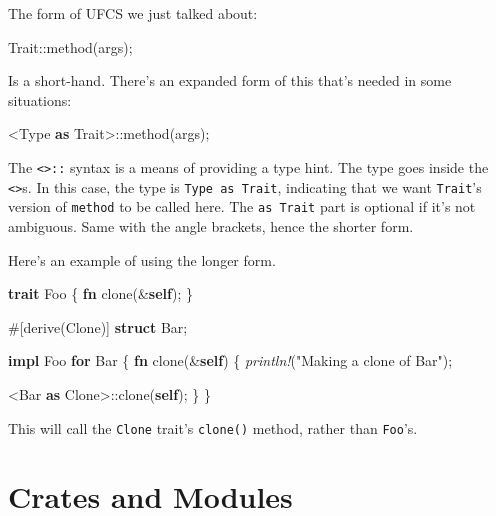 \documentclass[a4paper,]{book}
\newenvironment{Shaded}{\begin{snugshade}}{\end{snugshade}}
\newcommand{\KeywordTok}[1]{\textcolor[rgb]{0.13,0.29,0.53}{\textbf{{#1}}}}
\newcommand{\StringTok}[1]{\textcolor[rgb]{0.31,0.60,0.02}{{#1}}}
\newcommand{\BuiltInTok}[1]{{#1}}
\newcommand{\PreprocessorTok}[1]{\textcolor[rgb]{0.56,0.35,0.01}{\textit{{#1}}}}
\newcommand{\AttributeTok}[1]{\textcolor[rgb]{0.77,0.63,0.00}{{#1}}}
\newcommand{\NormalTok}[1]{{#1}}
\begin{document}
The form of UFCS we just talked about:

\begin{Shaded}
\begin{Highlighting}[]
\NormalTok{Trait::method(args);}
\end{Highlighting}
\end{Shaded}

Is a short-hand. There's an expanded form of this that's needed in some
situations:

\begin{Shaded}
\begin{Highlighting}[]
\NormalTok{<Type }\KeywordTok{as} \NormalTok{Trait>::method(args);}
\end{Highlighting}
\end{Shaded}

The \texttt{\textless{}\textgreater{}::} syntax is a means of providing
a type hint. The type goes inside the
\texttt{\textless{}\textgreater{}}s. In this case, the type is
\texttt{Type\ as\ Trait}, indicating that we want \texttt{Trait}'s
version of \texttt{method} to be called here. The \texttt{as\ Trait}
part is optional if it's not ambiguous. Same with the angle brackets,
hence the shorter form.

Here's an example of using the longer form.

\begin{Shaded}
\begin{Highlighting}[]
\KeywordTok{trait} \NormalTok{Foo \{}
    \KeywordTok{fn} \NormalTok{clone(&}\KeywordTok{self}\NormalTok{);}
\NormalTok{\}}

\AttributeTok{#[}\NormalTok{derive}\AttributeTok{(}\BuiltInTok{Clone}\AttributeTok{)]}
\KeywordTok{struct} \NormalTok{Bar;}

\KeywordTok{impl} \NormalTok{Foo }\KeywordTok{for} \NormalTok{Bar \{}
    \KeywordTok{fn} \NormalTok{clone(&}\KeywordTok{self}\NormalTok{) \{}
        \PreprocessorTok{println!}\NormalTok{(}\StringTok{"Making a clone of Bar"}\NormalTok{);}

        \NormalTok{<Bar }\KeywordTok{as} \BuiltInTok{Clone}\NormalTok{>::clone(}\KeywordTok{self}\NormalTok{);}
    \NormalTok{\}}
\NormalTok{\}}
\end{Highlighting}
\end{Shaded}

This will call the \texttt{Clone} trait's \texttt{clone()} method,
rather than \texttt{Foo}'s.

\section{Crates and Modules}\label{sec--crates-and-modules}
\end{document}
